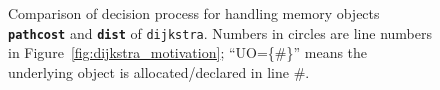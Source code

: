 \begin{figure}[!t]
\centering
{}
\caption{Comparison of decision process for handling memory
objects \texttt{\textbf{pathcost}} and \texttt{\textbf{dist}} of
\texttt{dijkstra}. Numbers in circles are line numbers in
Figure~\ref{fig:dijkstra_motivation}; ``UO=\{\#\}'' means the underlying
object is allocated/declared in line \#.}
\label{fig:dijkstra_motivation_comparison}
\end{figure}

